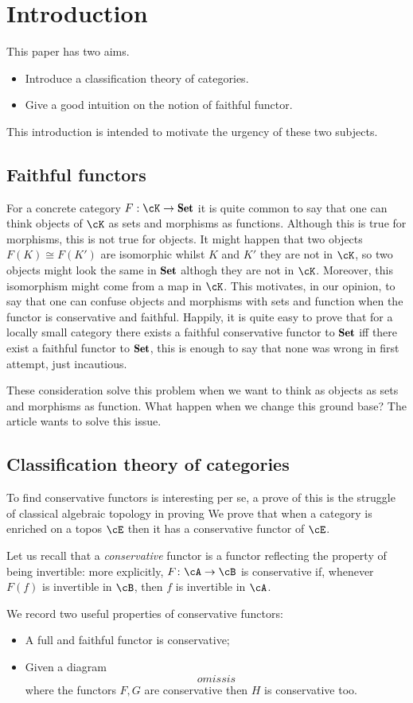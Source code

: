 \documentclass[a4paper,10pt,draft]{amsart}
\begin{document}


\section{Introduction}
This paper has two aims. 
\begin{itemize}
\item Introduce a classification theory of categories.
\item Give a good intuition on the notion of faithful functor.
\end{itemize}
This introduction is intended to motivate the urgency of these two subjects.

\subsection{Faithful functors}


For a concrete category $F: \cK \to \Set$ it is quite common to say that one can think objects of $\cK$ as sets and morphisms as functions. Although this is true for morphisms, this is not true for objects. It might happen that two objects $F(K) \cong F(K')$ are isomorphic whilst $K$ and $K'$ they are not in $\cK$, so two objects might look the same in $\Set$ althogh they are not in $\cK$. Moreover, this isomorphism might come from a map in $\cK$. This motivates, in our opinion, to say that one can confuse objects and morphisms with sets and function when the functor is conservative and faithful.
Happily, it is quite easy to prove that for a locally small category there exists a faithful conservative functor to $\Set$ iff there exist a faithful functor to $\Set$, this is enough to say that none was wrong in first attempt, just incautious.

These consideration solve this problem when we want to think as objects as sets and morphisms as function. What happen when we change this ground base? The article wants to solve this issue.

\subsection{Classification theory of categories}

To find conservative functors is interesting per se, a prove of this is the struggle of classical algebraic topology in proving 
We prove that when a category is enriched on a topos $\cE$ then it has a conservative functor of $\cE$. 

Let us recall that a \emph{conservative} functor is a functor reflecting the property of being invertible: more explicitly, $F \colon \cA \to \cB$ is conservative if, whenever $F(f)$ is invertible in $\cB$, then $f$ is invertible in $\cA$.
\begin{remark}
We record two useful properties of conservative functors:
\begin{itemize}
	\item A full and faithful functor is conservative;
	\item Given a diagram 
	\[
		omissis
	\]
	where the functors $F,G$ are conservative then $H$ is conservative too.
\end{itemize}
\end{remark}
\end{document}
